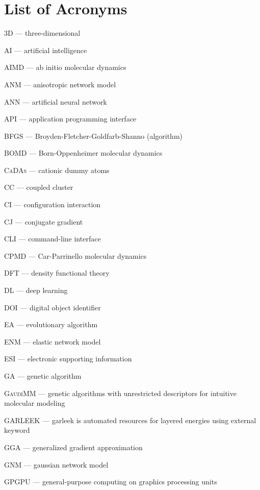 
\chapter*{List of Acronyms}

\textsc{3D} --- three-dimensional

\textsc{AI} --- artificial intelligence

\textsc{AIMD} --- ab initio molecular dynamics

\textsc{ANM} --- anisotropic network model

\textsc{ANN} --- artificial neural network

\textsc{API} --- application programming interface

\textsc{BFGS} --- Broyden-Fletcher-Goldfarb-Shanno (algorithm)

\textsc{BOMD} --- Born-Oppenheimer molecular dynamics

\textsc{CaDAs} --- cationic dummy atoms

\textsc{CC} --- coupled cluster

\textsc{CI} --- configuration interaction

\textsc{CJ} --- conjugate gradient

\textsc{CLI} --- command-line interface

\textsc{CPMD} --- Car-Parrinello molecular dynamics

\textsc{DFT} --- density functional theory

\textsc{DL} --- deep learning

\textsc{DOI} --- digital object identifier

\textsc{EA} --- evolutionary algorithm

\textsc{ENM} --- elastic network model

\textsc{ESI} --- electronic supporting information

\textsc{GA} --- genetic algorithm

\textsc{GaudiMM} --- genetic algorithms with unrestricted descriptors for intuitive molecular modeling

\textsc{GARLEEK} --- garleek is automated resources for layered energies using external keyword

\textsc{GGA} --- generalized gradient approximation

\textsc{GNM} --- gaussian network model

\textsc{GPGPU} --- general-purpose computing on graphics processing units

